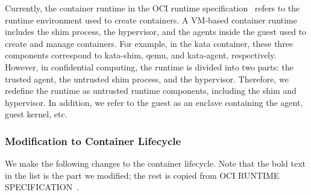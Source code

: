 Currently, the container runtime in the OCI runtime specification~\cite*{oci-runtime-spec} refers to the runtime environment used to create containers. A VM-based container runtime includes the shim process, the hypervisor, and the agents inside the guest used to create and manage containers. 
For example, in the kata container, these three components correspond to kata-shim, qemu, and kata-agent, respectively. However, in confidential computing, the runtime is divided into two parts: the trusted agent, the untrusted shim process, and the hypervisor. Therefore, we redefine 
the runtime as untrusted runtime components, including the shim and hypervisor. In addition, we refer to the guest as an enclave containing the agent, guest kernel, etc.

\subsubsection{Modification to Container Lifecycle}
We make the following changes to the container lifecycle. Note that the bold text in the list is the part we modified; the rest is copied from OCI RUNTIME SPECIFICATION~\cite*{oci-runtime-spec}.

